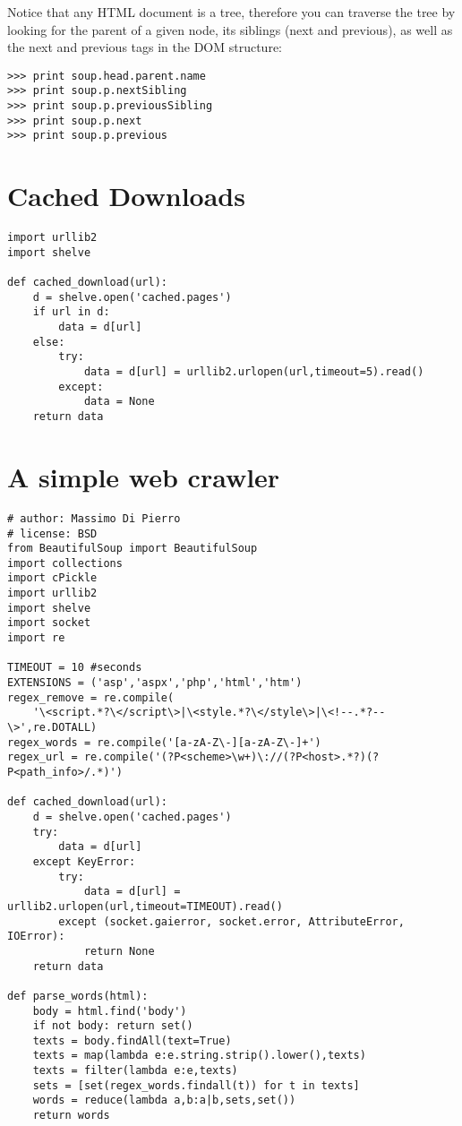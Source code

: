 \documentclass[justified,sixbynine]{tufte-book}
\theoremstyle{plain}%
\theoremstyle{definition}
\theoremstyle{remark}
\begin{document}
\begin{fullwidth}
Notice that any HTML document is a tree, therefore you can traverse the tree by looking for the parent of a given node, its siblings (next and previous), as well as the next and previous tags in the DOM structure:
\begin{lstlisting}
>>> print soup.head.parent.name
>>> print soup.p.nextSibling
>>> print soup.p.previousSibling
>>> print soup.p.next
>>> print soup.p.previous
\end{lstlisting}

\goodbreak\section{Cached Downloads}

\begin{lstlisting}
import urllib2
import shelve

def cached_download(url):
    d = shelve.open('cached.pages')
    if url in d:
        data = d[url]
    else:
        try:
            data = d[url] = urllib2.urlopen(url,timeout=5).read()
        except:
            data = None
    return data
\end{lstlisting}

\goodbreak\section{A simple web crawler}

\begin{lstlisting}
# author: Massimo Di Pierro
# license: BSD
from BeautifulSoup import BeautifulSoup
import collections
import cPickle
import urllib2
import shelve
import socket
import re

TIMEOUT = 10 #seconds
EXTENSIONS = ('asp','aspx','php','html','htm')
regex_remove = re.compile(
    '\<script.*?\</script\>|\<style.*?\</style\>|\<!--.*?--\>',re.DOTALL)
regex_words = re.compile('[a-zA-Z\-][a-zA-Z\-]+')
regex_url = re.compile('(?P<scheme>\w+)\://(?P<host>.*?)(?P<path_info>/.*)')

def cached_download(url):
    d = shelve.open('cached.pages')
    try:
        data = d[url]
    except KeyError:
        try:
            data = d[url] = urllib2.urlopen(url,timeout=TIMEOUT).read()
        except (socket.gaierror, socket.error, AttributeError, IOError):
            return None
    return data

def parse_words(html):
    body = html.find('body')
    if not body: return set()
    texts = body.findAll(text=True)
    texts = map(lambda e:e.string.strip().lower(),texts)
    texts = filter(lambda e:e,texts)
    sets = [set(regex_words.findall(t)) for t in texts]
    words = reduce(lambda a,b:a|b,sets,set())
    return words


\end{lstlisting}
\end{fullwidth}
\end{document}
